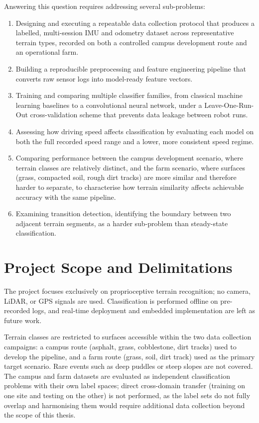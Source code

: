 Answering this question requires addressing several sub-problems:
\begin{enumerate}
    \item Designing and executing a repeatable data collection protocol that produces a labelled, multi-session IMU and odometry dataset across representative terrain types, recorded on both a controlled campus development route and an operational farm.
    \item Building a reproducible preprocessing and feature engineering pipeline that converts raw sensor logs into model-ready feature vectors.
    \item Training and comparing multiple classifier families, from classical machine learning baselines to a convolutional neural network, under a Leave-One-Run-Out cross-validation scheme that prevents data leakage between robot runs.
    \item Assessing how driving speed affects classification by evaluating each model on both the full recorded speed range and a lower, more consistent speed regime.
    \item Comparing performance between the campus development scenario, where terrain classes are relatively distinct, and the farm scenario, where surfaces (grass, compacted soil, rough dirt tracks) are more similar and therefore harder to separate, to characterise how terrain similarity affects achievable accuracy with the same pipeline.
    \item Examining transition detection, identifying the boundary between two adjacent terrain segments, as a harder sub-problem than steady-state classification.
\end{enumerate}

\section{Project Scope and Delimitations}

The project focuses exclusively on proprioceptive terrain recognition; no camera,
LiDAR, or GPS signals are used. Classification is performed offline on pre-recorded
logs, and real-time deployment and embedded implementation are left as future work.

Terrain classes are restricted to surfaces accessible within the two data collection
campaigns: a campus route (asphalt, grass, cobblestone, dirt tracks) used to develop
the pipeline, and a farm route (grass, soil, dirt track) used as the
primary target scenario. Rare events such as deep puddles or steep slopes are not
covered. The campus and farm datasets are evaluated as independent classification
problems with their own label spaces; direct cross-domain transfer (training on one
site and testing on the other) is not performed, as the label sets do not fully
overlap and harmonising them would require additional data collection beyond the
scope of this thesis.


